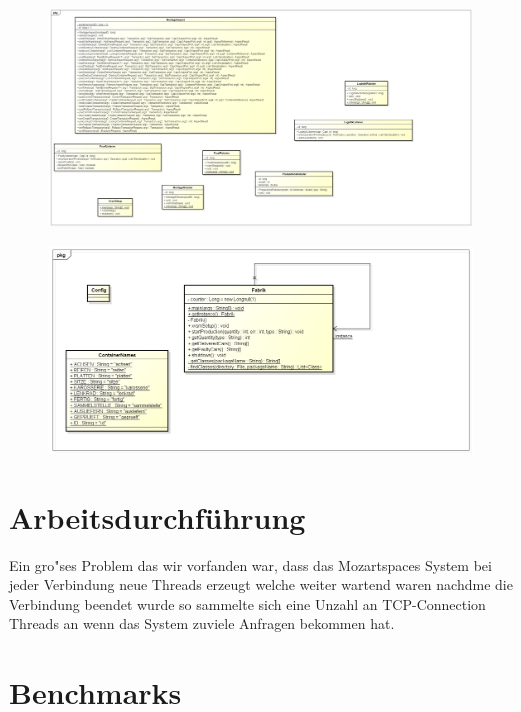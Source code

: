 \documentclass[a4paper,12pt]{scrreprt}
\begin{document}
\begin{figure}
\centering
\includegraphics[width=0.7\linewidth]{./XVSM_UML_1}
\caption{}
\label{fig:XVSM_UML_1}
\end{figure}
\begin{figure}
\centering
\includegraphics[width=0.7\linewidth]{./XVSM_UML_2}
\caption{}
\label{fig:XVSM_UML_2}
\end{figure}

\chapter{Arbeitsdurchführung}

	Ein gro"ses Problem das wir vorfanden war, dass das Mozartspaces System bei jeder Verbindung neue Threads erzeugt welche weiter wartend waren nachdme die Verbindung beendet wurde so sammelte sich eine Unzahl an TCP-Connection Threads an wenn das System zuviele Anfragen bekommen hat.
	
\chapter{Benchmarks}
\end{document}
